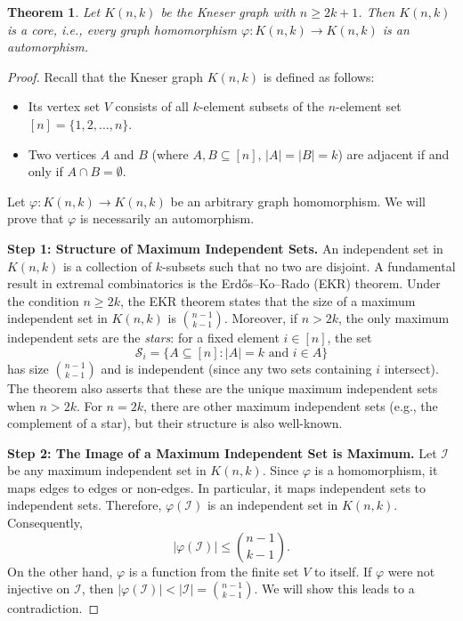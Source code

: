 \documentclass[12pt,a4paper,openany]{book}
\newtheorem{theorem}{Theorem}[section]
\begin{document}
\begin{theorem}
Let $K(n,k)$ be the Kneser graph with $n \ge 2k+1$. Then $K(n,k)$ is a \emph{core}, i.e., every graph homomorphism $\varphi: K(n,k) \to K(n,k)$ is an automorphism.
\end{theorem}

\begin{proof}
Recall that the Kneser graph $K(n,k)$ is defined as follows:
\begin{itemize}
    \item Its vertex set $V$ consists of all $k$-element subsets of the $n$-element set $[n] = \{1, 2, \dots, n\}$.
    \item Two vertices $A$ and $B$ (where $A, B \subseteq [n]$, $|A| = |B| = k$) are adjacent if and only if $A \cap B = \emptyset$.
\end{itemize}
Let $\varphi: K(n,k) \to K(n,k)$ be an arbitrary graph homomorphism. We will prove that $\varphi$ is necessarily an automorphism.

\textbf{Step 1: Structure of Maximum Independent Sets.}
An independent set in $K(n,k)$ is a collection of $k$-subsets such that no two are disjoint. A fundamental result in extremal combinatorics is the Erd\H{o}s–Ko–Rado (EKR) theorem. Under the condition $n \ge 2k$, the EKR theorem states that the size of a maximum independent set in $K(n,k)$ is $\binom{n-1}{k-1}$. Moreover, if $n > 2k$, the only maximum independent sets are the \emph{stars}: for a fixed element $i \in [n]$, the set
\[
\mathcal{S}_i = \{ A \subseteq [n] : |A| = k \text{ and } i \in A \}
\]
has size $\binom{n-1}{k-1}$ and is independent (since any two sets containing $i$ intersect). The theorem also asserts that these are the unique maximum independent sets when $n > 2k$. For $n = 2k$, there are other maximum independent sets (e.g., the complement of a star), but their structure is also well-known.

\textbf{Step 2: The Image of a Maximum Independent Set is Maximum.}
Let $\mathcal{I}$ be any maximum independent set in $K(n,k)$. Since $\varphi$ is a homomorphism, it maps edges to edges or non-edges. In particular, it maps independent sets to independent sets. Therefore, $\varphi(\mathcal{I})$ is an independent set in $K(n,k)$. Consequently,
\[
|\varphi(\mathcal{I})| \le \binom{n-1}{k-1}.
\]
On the other hand, $\varphi$ is a function from the finite set $V$ to itself. If $\varphi$ were not injective on $\mathcal{I}$, then $|\varphi(\mathcal{I})| < |\mathcal{I}| = \binom{n-1}{k-1}$. We will show this leads to a contradiction.


\end{proof}
\end{document}

